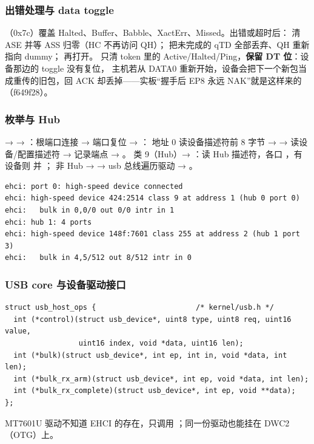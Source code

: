 \subsubsection{出错处理与 data toggle}

（0x7c）覆盖 Halted、Buffer、Babble、XactErr、Missed。出错或超时后：
 清 ASE 并等 ASS 归零（HC 不再访问 QH）； 把未完成的 qTD 全部丢弃、QH 重新指向 dummy；
 再打开。 只清 token 里的 Active/Halted/Ping，\textbf{保留 DT 位}：设备那边的 toggle 没有复位，
主机若从 DATA0 重新开始，设备会把下一个新包当成重传的旧包，回 ACK 却丢掉——实板“握手后 EP8 永远 NAK”就是这样来的（f649f28）。

\subsubsection{枚举与 Hub}

 →  → ：根端口连接 → 端口复位 → ：
地址 0 读设备描述符前 8 字节 →  → 读设备/配置描述符 →  记录端点 → 。
类 9（Hub）→ ：读 Hub 描述符，各口 ，有设备则  并 ；
非 Hub →  → usb 总线遍历驱动  → 。
\begin{lstlisting}[basicstyle=\ttfamily\small\color{tinygreen!70!black},backgroundcolor=\color{tinygreen!4}]
ehci: port 0: high-speed device connected
ehci: high-speed device 424:2514 class 9 at address 1 (hub 0 port 0)
ehci:   bulk in 0,0/0 out 0/0 intr in 1
ehci: hub 1: 4 ports
ehci: high-speed device 148f:7601 class 255 at address 2 (hub 1 port 3)
ehci:   bulk in 4,5/512 out 8/512 intr in 0
\end{lstlisting}

\subsubsection{USB core 与设备驱动接口}

\begin{lstlisting}
struct usb_host_ops {                       /* kernel/usb.h */
  int (*control)(struct usb_device*, uint8 type, uint8 req, uint16 value,
                 uint16 index, void *data, uint16 len);
  int (*bulk)(struct usb_device*, int ep, int in, void *data, int len);
  int (*bulk_rx_arm)(struct usb_device*, int ep, void *data, int len);
  int (*bulk_rx_complete)(struct usb_device*, int ep, void **data);
};
\end{lstlisting}
MT7601U 驱动不知道 EHCI 的存在，只调用 ；同一份驱动也能挂在 DWC2（OTG）上。

